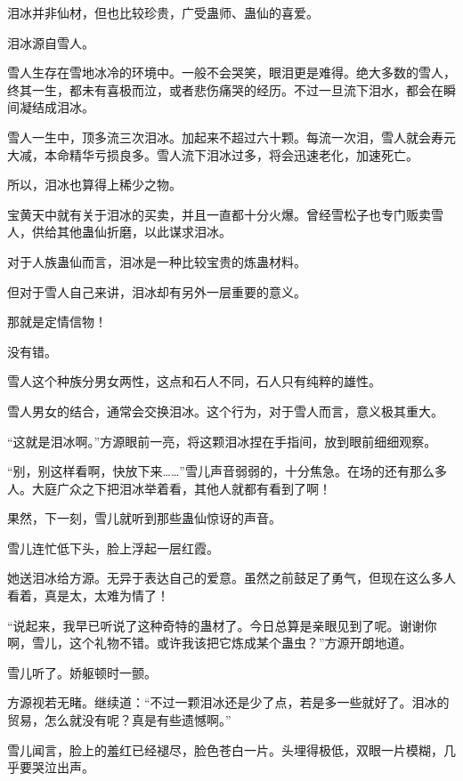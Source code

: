 
\begin{this_body}

泪冰并非仙材，但也比较珍贵，广受蛊师、蛊仙的喜爱。

泪冰源自雪人。

雪人生存在雪地冰冷的环境中。一般不会哭笑，眼泪更是难得。绝大多数的雪人，终其一生，都未有喜极而泣，或者悲伤痛哭的经历。不过一旦流下泪水，都会在瞬间凝结成泪冰。

雪人一生中，顶多流三次泪冰。加起来不超过六十颗。每流一次泪，雪人就会寿元大减，本命精华亏损良多。雪人流下泪冰过多，将会迅速老化，加速死亡。

所以，泪冰也算得上稀少之物。

宝黄天中就有关于泪冰的买卖，并且一直都十分火爆。曾经雪松子也专门贩卖雪人，供给其他蛊仙折磨，以此谋求泪冰。

对于人族蛊仙而言，泪冰是一种比较宝贵的炼蛊材料。

但对于雪人自己来讲，泪冰却有另外一层重要的意义。

那就是定情信物！

没有错。

雪人这个种族分男女两性，这点和石人不同，石人只有纯粹的雄性。

雪人男女的结合，通常会交换泪冰。这个行为，对于雪人而言，意义极其重大。

“这就是泪冰啊。”方源眼前一亮，将这颗泪冰捏在手指间，放到眼前细细观察。

“别，别这样看啊，快放下来……”雪儿声音弱弱的，十分焦急。在场的还有那么多人。大庭广众之下把泪冰举着看，其他人就都有看到了啊！

果然，下一刻，雪儿就听到那些蛊仙惊讶的声音。

雪儿连忙低下头，脸上浮起一层红霞。

她送泪冰给方源。无异于表达自己的爱意。虽然之前鼓足了勇气，但现在这么多人看着，真是太，太难为情了！

“说起来，我早已听说了这种奇特的蛊材了。今日总算是亲眼见到了呢。谢谢你啊，雪儿，这个礼物不错。或许我该把它炼成某个蛊虫？”方源开朗地道。

雪儿听了。娇躯顿时一颤。

方源视若无睹。继续道：“不过一颗泪冰还是少了点，若是多一些就好了。泪冰的贸易，怎么就没有呢？真是有些遗憾啊。”

雪儿闻言，脸上的羞红已经褪尽，脸色苍白一片。头埋得极低，双眼一片模糊，几乎要哭泣出声。


\end{this_body}
